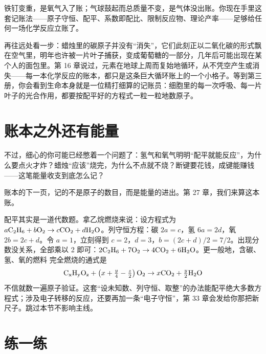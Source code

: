 铁钉变重，是氧气入了账；气球鼓起而总质量不变，是气体没出账。你现在手里这套记账法——原子守恒、配平、系数即配比、限制反应物、理论产率——足够给任何一场化学反应立账了。

再往远处看一步：蜡烛里的碳原子并没有“消失”，它们此刻正以二氧化碳的形式飘在空气里，明年也许被一片叶子捕获，变成葡萄糖的一部分，几年后可能出现在某个人的面包里。第 16 章说过，元素在地球上周而复始地循环，从不凭空产生或消失——每一本化学反应的账本，都只是这条巨大循环账上的一个小格子。等到第三册，你会看到生命本身就是一位精打细算的记账员：细胞里的每一次呼吸、每一片叶子的光合作用，都要按配平好的方程式一粒一粒地数原子。

\section{账本之外还有能量}

不过，细心的你可能已经憋着一个问题了：氢气和氧气明明“配平就能反应”，为什么要点火才炸？蜡烛“应该”烧完，为什么不点就不烧？断键要花钱，成键能赚钱——这笔能量收支到底怎么记？

账本的下一页，记的不是原子的数目，而是能量的进出。第 27 章，我们来算这本账。

\begin{tiaozhan}
配平其实是一道代数题。拿乙烷燃烧来说：设方程式为 $a\mathrm{C_2H_6} + b\mathrm{O_2} \rightarrow c\mathrm{CO_2} + d\mathrm{H_2O}$。列守恒方程：碳 $2a=c$，氢 $6a=2d$，氧 $2b=2c+d$。令 $a=1$，立刻得到 $c=2$，$d=3$，$b=(2c+d)/2=7/2$。出现分数没关系，全部乘以 2 即可：$\mathrm{2C_2H_6} + \mathrm{7O_2} \rightarrow \mathrm{4CO_2} + \mathrm{6H_2O}$。更一般地，含碳、氢、氧的燃料  完全燃烧的通式是
\[\mathrm{C_xH_yO_z} + \left(x+\tfrac{y}{4}-\tfrac{z}{2}\right)\mathrm{O_2} \rightarrow x\mathrm{CO_2} + \tfrac{y}{2}\mathrm{H_2O}\]
不信就数一遍原子验证。这套“设未知数、列守恒、取整”的办法能配平绝大多数方程式；涉及电子转移的反应，还要再加一条“电子守恒”，第 33 章会发给你那把新尺子。跳过本节不影响主线。
\end{tiaozhan}

\section*{练一练}


